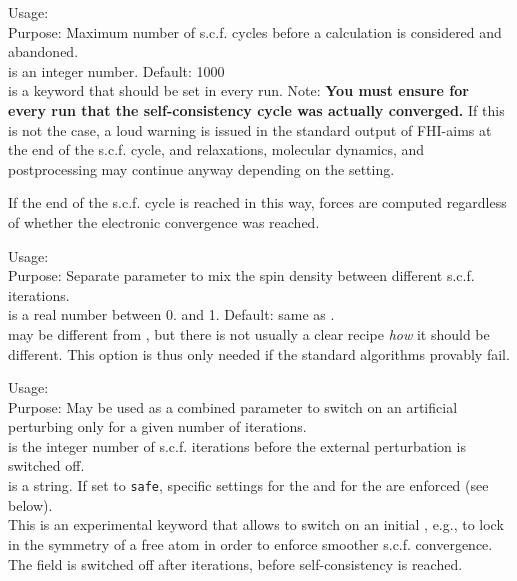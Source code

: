 {
  \noindent
  Usage:   \\[1.0ex]
  Purpose: Maximum number of s.c.f. cycles before a calculation is
    considered and abandoned. \\[1.0ex]
   is an integer number. Default: 1000 \\
}
 is a keyword that should be set in every
run. Note: \textbf{You must ensure for every run that the
self-consistency cycle was actually converged.} If this is not the
case, a loud warning is issued in the standard output of FHI-aims at
the end of the s.c.f. cycle, and relaxations, molecular dynamics,
and postprocessing may continue anyway depending on the
 setting. 

If the end of the s.c.f. cycle is reached in this way, forces are
computed regardless of whether the electronic convergence was reached.

{
  \noindent
  Usage:   \\[1.0ex]
  Purpose: Separate parameter to mix the spin density between
    different s.c.f. iterations. \\[1.0ex] 
   is a real number between 0. and 1. Default: same as
  . \\ 
}
 may be different from
, but there is not usually a clear recipe
\emph{how} it should be different. This option is thus only needed if
the standard algorithms provably fail. 

{
  \noindent
  Usage:    \\[1.0ex]
  Purpose: May be used as a combined parameter to switch on
    an artificial perturbing  only for a given 
    number of iterations. \\[1.0ex]
   is the integer number of s.c.f. iterations before
    the external perturbation is switched off. \\
   is a string. If set to \texttt{safe}, specific
    settings for the  and for the
     are enforced (see below). \\
}
This is an experimental keyword that allows to switch on an initial
, e.g., to lock in the symmetry of a free
atom in order to enforce smoother s.c.f. convergence. The field is
switched off after  iterations, before self-consistency
is reached.

